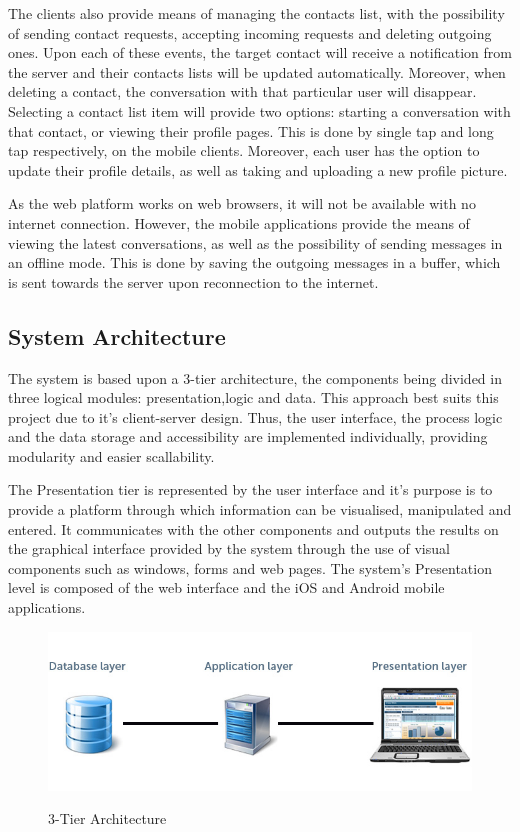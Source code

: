 \documentclass{article}
\begin{document}
	The clients also provide means of managing the contacts list, with the possibility of sending contact requests, accepting incoming requests and deleting outgoing ones. Upon each of these events, the target contact will receive a notification from the server and their contacts lists will be updated automatically. Moreover, when deleting a contact, the conversation with that particular user will disappear. Selecting a contact list item will provide two options: starting a conversation with that contact, or viewing 	their profile pages. This is done by single tap and long tap respectively, on the mobile clients. Moreover, each user has the option to update their profile details, as well as taking and uploading a new profile picture.\par
	
	As the web platform works on web browsers, it will not be available with no internet connection. However, the mobile applications provide the means of viewing the latest conversations, as well as the possibility of sending messages in an offline mode. This is done by saving the outgoing messages in a buffer, which is sent towards the server upon reconnection to the internet.\par
	\newpage
	\subsection{System Architecture}
	
	The system is based upon a 3-tier architecture, the components being divided in three logical modules: presentation,logic and data. This approach best suits this project due to it's client-server design. Thus, the user interface, the process logic and the data storage and accessibility are implemented individually, providing modularity and easier scallability.\par
	
	The Presentation tier is represented by the user interface and it's purpose is to provide a platform through which information can be visualised, manipulated and entered. It communicates with the other components and outputs the results on the graphical interface provided by the system through the use of visual components such as windows, forms and web pages. The system's Presentation level is composed of the web interface and the iOS and Android mobile applications.\par
	
	\begin{figure}[H]
		\centering
		\includegraphics[scale=0.3]{client-server.jpg}
		\caption{3-Tier Architecture}
		\cite{3tierarchitecture}
	\end{figure}
\end{document}
